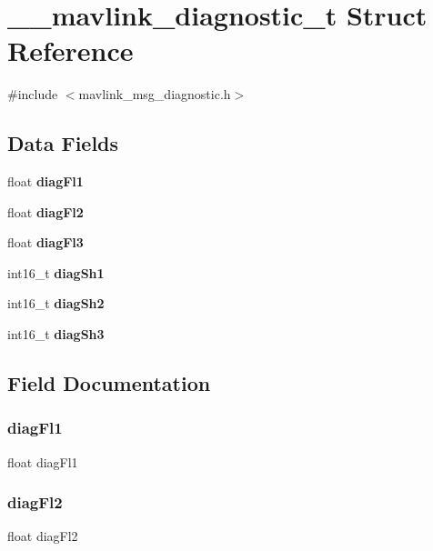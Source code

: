 \section{\+\_\+\+\_\+mavlink\+\_\+diagnostic\+\_\+t Struct Reference}
\label{struct____mavlink__diagnostic__t}


{\ttfamily \#include $<$mavlink\+\_\+msg\+\_\+diagnostic.\+h$>$}

\subsection*{Data Fields}
\begin{DoxyCompactItemize}
\item 
float \textbf{ diag\+Fl1}
\item 
float \textbf{ diag\+Fl2}
\item 
float \textbf{ diag\+Fl3}
\item 
int16\+\_\+t \textbf{ diag\+Sh1}
\item 
int16\+\_\+t \textbf{ diag\+Sh2}
\item 
int16\+\_\+t \textbf{ diag\+Sh3}
\end{DoxyCompactItemize}


\subsection{Field Documentation}
\mbox{\label{struct____mavlink__diagnostic__t_ab85bf03b5f5376ab2bfcf8bd466d926b}} 
\subsubsection{diag\+Fl1}
{\footnotesize\ttfamily float diag\+Fl1}

\mbox{\label{struct____mavlink__diagnostic__t_add637e3639883f15074efaa19eb31f62}} 
\subsubsection{diag\+Fl2}
{\footnotesize\ttfamily float diag\+Fl2}

